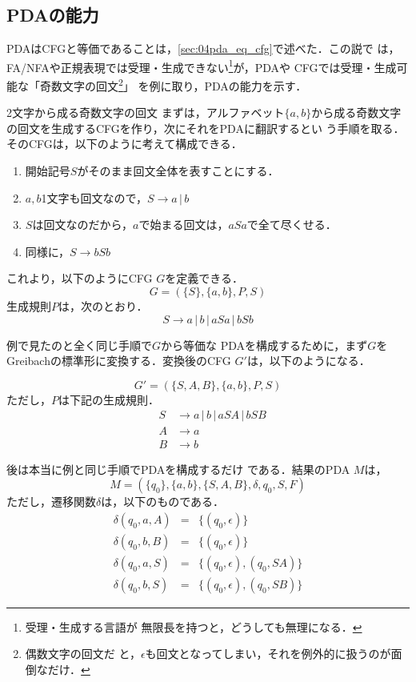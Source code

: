 \subsection{PDAの能力}
PDAはCFGと等価であることは，\ref{sec:04pda_eq_cfg}で述べた．この説で
は，FA/NFAや正規表現では受理・生成できない\footnote{受理・生成する言語が
無限長を持つと，どうしても無理になる．}が，PDAや
CFGでは受理・生成可能な「奇数文字の回文\footnote{偶数文字の回文だ
と，$\epsilon$も回文となってしまい，それを例外的に扱うのが面倒なだけ．}」
を例に取り，PDAの能力を示す．

\begin{myexample}{2文字から成る奇数文字の回文} 
 まずは，アルファベット$\{a,b\}$から成る奇数文字の回文を生成するCFGを作り，次にそれをPDAに翻訳するとい
 う手順を取る．そのCFGは，以下のように考えて構成できる．

 \begin{enumerate}
  \item 開始記号$S$がそのまま回文全体を表すことにする．
  \item $a,b$1文字も回文なので，$S \rightarrow a \, | \, b$
  \item $S$は回文なのだから，$a$で始まる回文は，$aSa$で全て尽くせる．
  \item 同様に，$S \rightarrow bSb$
 \end{enumerate}
 これより，以下のようにCFG $G$を定義できる．
 \[
  G = (\{S\}, \{a, b\}, P, S)
 \]
 生成規則$P$は，次のとおり．
 \[
  S \rightarrow a \, | \, b \, | \, aSa \, | \, bSb
 \]

 例で見たのと全く同じ手順で$G$から等価な
 PDAを構成するために，まず$G$をGreibachの標準形に変換する．変換後のCFG
 $G'$は，以下のようになる．

 \[
  G' = (\{S, A, B\}, \{a, b\}, P, S)
 \]
 ただし，$P$は下記の生成規則．
 \begin{eqnarray*}
  &S& \rightarrow a \, | \, b \, | \, aSA \, | \, bSB \\
  &A& \rightarrow a \\
  &B& \rightarrow b 
 \end{eqnarray*}

 後は本当に例と同じ手順でPDAを構成するだけ
 である．結果のPDA $M$は，
 \[
  M = (\{q_0\}, \{a, b\}, \{S, A, B\} , \delta , q_0 , S, F)
 \]
 ただし，遷移関数$\delta$は，以下のものである．
 \begin{eqnarray*}
  \delta (q_0, a, A) &=& \{(q_0, \epsilon)\} \\
  \delta (q_0, b, B) &=& \{(q_0, \epsilon)\} \\
  \delta (q_0, a, S) &=& \{(q_0, \epsilon), (q_0, SA )\} \\
  \delta (q_0, b, S) &=& \{(q_0, \epsilon), (q_0, SB)\}
 \end{eqnarray*}


\end{myexample}
